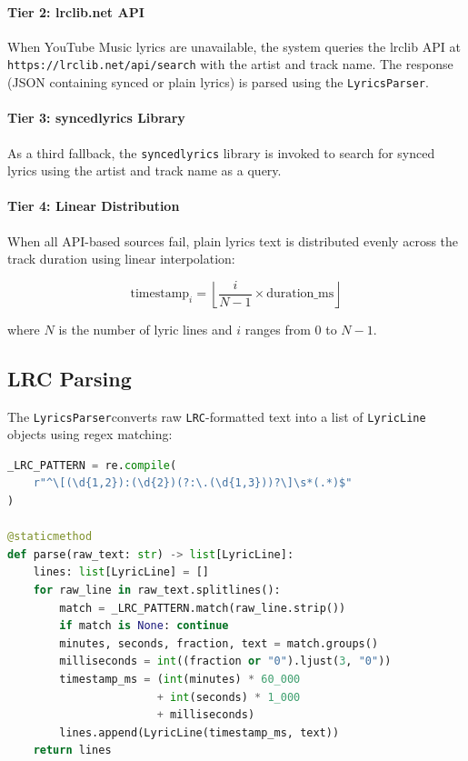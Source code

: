 \documentclass[a4paper,11pt,twoside]{article}
\newcommand{\lrc}{\texttt{LRC}}
\newcommand{\lyric}{\texttt{LyricLine}}
\newcommand{\lyricsparser}{\texttt{LyricsParser}}
\begin{document}
\paragraph{Tier 2: lrclib.net API}
When YouTube Music lyrics are unavailable, the system queries the lrclib
API \cite{lrclib} at \texttt{https://lrclib.net/api/search} with the
artist and track name. The response (JSON containing synced or plain
lyrics) is parsed using the \lyricsparser.

\paragraph{Tier 3: syncedlyrics Library}
As a third fallback, the \texttt{syncedlyrics} library is invoked to search
for synced lyrics using the artist and track name as a query.

\paragraph{Tier 4: Linear Distribution}
When all API-based sources fail, plain lyrics text is distributed evenly
across the track duration using linear interpolation:

\begin{equation}
    \text{timestamp}_i = \left\lfloor \frac{i}{N-1} \times \text{duration\_ms} \right\rfloor
\end{equation}

where $N$ is the number of lyric lines and $i$ ranges from $0$ to $N-1$.

\subsection{LRC Parsing}

The \lyricsparser converts raw \lrc-formatted text into a list of \lyric
objects using regex matching:

\begin{lstlisting}[language=Python, caption={LRC timestamp parsing.}]
_LRC_PATTERN = re.compile(
    r"^\[(\d{1,2}):(\d{2})(?:\.(\d{1,3}))?\]\s*(.*)$"
)

@staticmethod
def parse(raw_text: str) -> list[LyricLine]:
    lines: list[LyricLine] = []
    for raw_line in raw_text.splitlines():
        match = _LRC_PATTERN.match(raw_line.strip())
        if match is None: continue
        minutes, seconds, fraction, text = match.groups()
        milliseconds = int((fraction or "0").ljust(3, "0"))
        timestamp_ms = (int(minutes) * 60_000
                       + int(seconds) * 1_000
                       + milliseconds)
        lines.append(LyricLine(timestamp_ms, text))
    return lines
\end{lstlisting}
\end{document}
